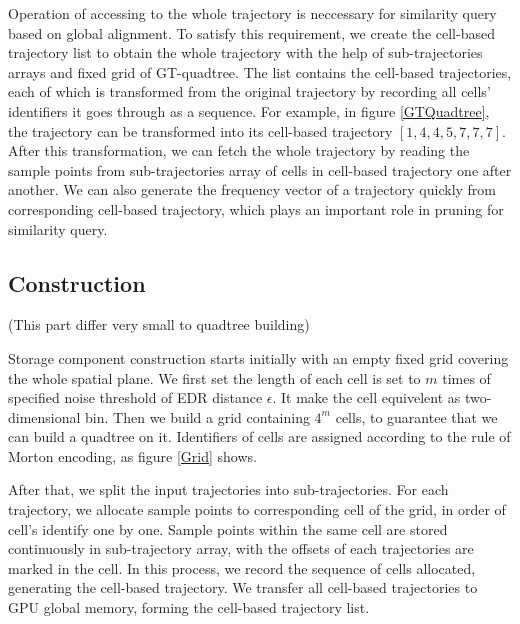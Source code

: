 \documentclass[conference]{IEEEtran}
\begin{document}
Operation of accessing to the whole trajectory is neccessary for similarity query based on global alignment. To satisfy this requirement, we create the cell-based trajectory list to obtain the whole trajectory with the help of sub-trajectories arrays and fixed grid of GT-quadtree. The list contains the cell-based trajectories, each of which is transformed from the original trajectory by recording all cells' identifiers it goes through as a sequence. For example, in figure \ref{GTQuadtree}, the trajectory can be transformed into its cell-based trajectory $[1,4,4,5,7,7,7]$. After this transformation, we can fetch the whole trajectory by reading the sample points from sub-trajectories array of cells in cell-based trajectory one after another. We can also generate the frequency vector of a trajectory quickly from corresponding cell-based trajectory, which plays an important role in pruning for similarity query.

\subsection{Construction}

(This part differ very small to quadtree building)

Storage component construction starts initially with an empty fixed grid covering the whole spatial plane. We first set the length of each cell is set to $m$ times of specified noise threshold of EDR distance $\epsilon$. It make the cell equivelent as two-dimensional bin. Then we build a grid containing $4^{m}$ cells, to guarantee that we can build a quadtree on it. Identifiers of cells are assigned according to the rule of Morton encoding, as figure \ref{Grid} shows.

After that, we split the input trajectories into sub-trajectories. For each trajectory, we allocate sample points to corresponding cell of the grid, in order of cell's identify one by one. Sample points within the same cell are stored continuously in sub-trajectory array, with the offsets of each trajectories are marked in the cell. In this process, we record the sequence of cells allocated, generating the cell-based trajectory. We transfer all cell-based trajectories to GPU global memory, forming the cell-based trajectory list. 
\end{document}
